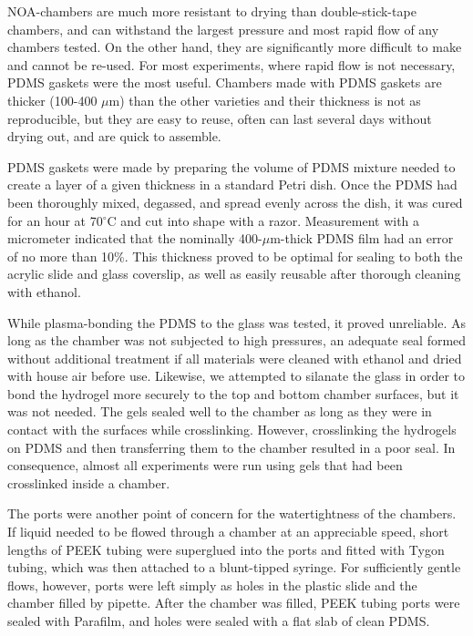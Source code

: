 NOA-chambers are much more resistant to drying than double-stick-tape chambers, and can withstand the largest pressure and most rapid flow of any chambers tested.  On the other hand, they are significantly more difficult to make and cannot be re-used.  For most experiments, where rapid flow is not necessary, PDMS gaskets were the most useful.  Chambers made with PDMS gaskets are thicker (100-400 $\mu$m) than the other varieties and their thickness is not as reproducible, but they are easy to reuse, often can last several days without drying out, and are quick to assemble.  

PDMS gaskets were made by preparing the volume of PDMS mixture needed to create a layer of a given thickness in a standard Petri dish.  Once the PDMS had been thoroughly mixed, degassed, and spread evenly across the dish, it was cured for an hour at 70$^\circ$C and cut into shape with a razor.  Measurement with a micrometer indicated that the nominally 400-$\mu$m-thick PDMS film had an error of no more than 10\%.  This thickness proved to be optimal for sealing to both the acrylic slide and glass coverslip, as well as easily reusable after thorough cleaning with ethanol.

While plasma-bonding the PDMS to the glass was tested, it proved unreliable.  As long as the chamber was not subjected to high pressures, an adequate seal formed without additional treatment if all materials were cleaned with ethanol and dried with house air before use. Likewise, we attempted to silanate the glass in order to bond the hydrogel more securely to the top and bottom chamber surfaces, but it was not needed.  The gels sealed well to the chamber as long as they were in contact with the surfaces while crosslinking.  However, crosslinking the hydrogels on PDMS and then transferring them to the chamber resulted in a poor seal.  In consequence, almost all experiments were run using gels that had been crosslinked inside a chamber.

The ports were another point of concern for the watertightness of the chambers.  If liquid needed to be flowed through a chamber at an appreciable speed, short lengths of PEEK tubing were superglued into the ports and fitted with Tygon tubing, which was then attached to a blunt-tipped syringe.  For sufficiently gentle flows, however, ports were left simply as holes in the plastic slide and the chamber filled by pipette.  After the chamber was filled, PEEK tubing ports were sealed with Parafilm, and holes were sealed with a flat slab of clean PDMS.

